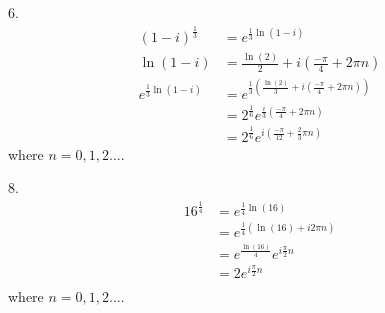 \documentclass[11pt]{homework}
\begin{document}
6.
\begin{align*}
(1-i)^{\frac{1}{3}}
  &= e^{ \frac{1}{3} \ln (1-i)} \\
\ln (1-i) &= \frac{\ln(2)}{2} + i( \frac{-\pi}{4} + 2\pi n) \\
e^{\frac{1}{3} \ln (1-i)} 
  &= e^{ \frac{1}{3} 
    \left(
      \frac{\ln(2)}{3} + i (\frac{-\pi}{4} + 2 \pi n)
    \right)} \\
  &= 2^{\frac{1}{6}} e^{\frac{i}{3}(\frac{-\pi}{4} + 2 \pi n)} \\
  &= 2^{\frac{1}{6}} e^{i(\frac{-\pi}{12} + \frac{2}{3} \pi n)}
\end{align*}  
where $n=0,1,2...$.

8.
\begin{align*}
16^{\frac{1}{4}} &= e^{\frac{1}{4} \ln (16)} \\
  &= e^{\frac{1}{4} \left(\ln (16) + i2\pi n \right)}  \\
  &= e^{\frac{\ln(16)}{4}} e^{ i\frac{\pi}{2} n}  \\
  &= 2 e^{ i\frac{\pi}{2} n}  \\
\end{align*}
where $n=0,1,2...$.
\end{document}
